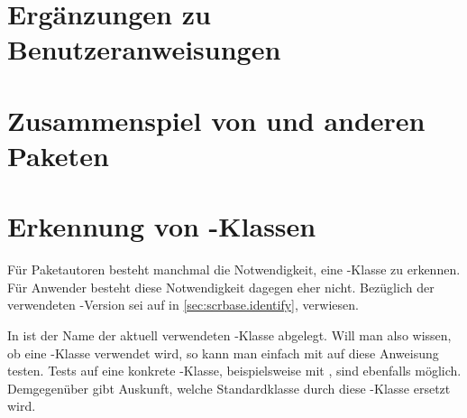 
\section{Ergänzungen zu Benutzeranweisungen}



\section{Zusammenspiel von \KOMAScript{} und anderen Paketen}



\section{Erkennung von \KOMAScript-Klassen}

Für Paketautoren besteht manchmal die Notwendigkeit, eine \KOMAScript-Klasse
zu erkennen. Für Anwender besteht diese Notwendigkeit dagegen eher
nicht. Bezüglich der verwendeten \KOMAScript-Version sei auf
 in \autoref{sec:scrbase.identify},
 verwiesen.

\begin{Declaration}
\end{Declaration}
In  ist der Name der aktuell verwendeten
\KOMAScript-Klasse abgelegt. Will man also wissen, ob eine \KOMAScript-Klasse
verwendet wird, so kann man einfach mit  auf diese
Anweisung testen. Tests auf eine konkrete \KOMAScript-Klasse, beispielsweise
mit , sind ebenfalls möglich. Demgegenüber gibt
 Auskunft, welche Standardklasse durch diese
\KOMAScript-Klasse ersetzt wird.%
%
\EndIndexGroup


